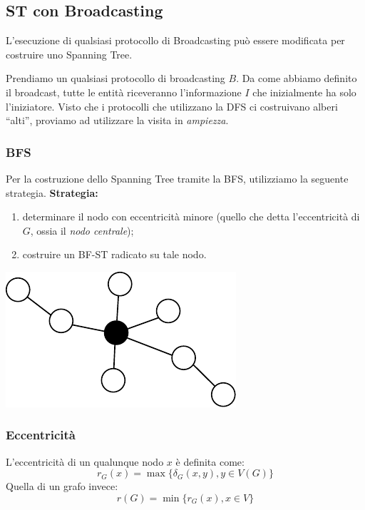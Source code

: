 \subsection{ST con Broadcasting}

\begin{theorem}
    L'esecuzione di qualsiasi protocollo di Broadcasting può essere modificata
    per costruire uno Spanning Tree.
\end{theorem}

Prendiamo un qualsiasi protocollo di broadcasting $B$. Da come abbiamo definito il
broadcast, tutte le entità riceveranno l'informazione $I$ che inizialmente ha
solo l'iniziatore.
Visto che i protocolli che utilizzano la DFS ci costruivano alberi ``alti'',
proviamo ad utilizzare la visita in \textit{ampiezza}.

\subsubsection{BFS}
Per la costruzione dello Spanning Tree tramite la BFS, utilizziamo la seguente
strategia.
\textbf{Strategia:}
\begin{enumerate}
    \item determinare il nodo con eccentricità minore (quello che detta
          l'eccentricità di $G$, ossia il \textit{nodo centrale});
    \item costruire un BF-ST radicato su tale nodo.
\end{enumerate}

\begin{center}
    \includegraphics[scale=1]{capitoli/costruzione-spanning-tree/imgs/n_24}
\end{center}

\subsubsection{Eccentricità}
L'eccentricità di un qualunque nodo $x$ è definita come:
$$
    r_G(x) = \max\{\delta_G(x,y), y \in V(G)\}
$$
Quella di un grafo invece:
$$
    r(G) = \min \{ r_G(x), x \in V \}
$$


